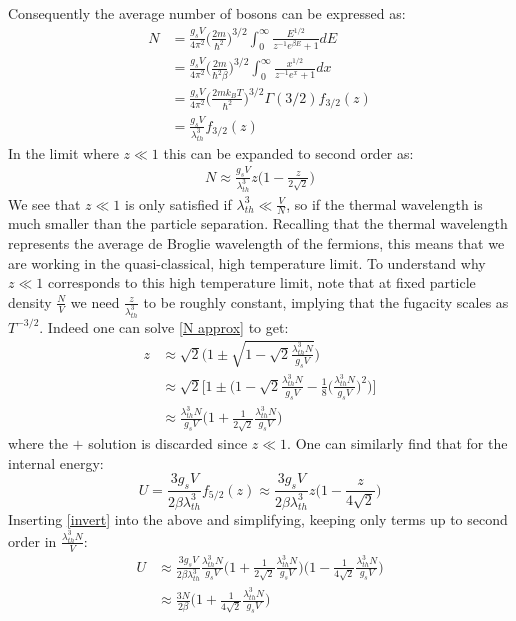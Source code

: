 \documentclass[a4paper,11pt,oneside]{book}
\begin{document}
Consequently the average number of bosons can be expressed as:
\begin{align}
   N &=\frac{g_s V}{4\pi^2} \bigg(\frac{2m}{\hbar^2}\bigg)^{3/2}\int_0^\infty \frac{E^{1/2}}{z^{-1}e^{\beta E}+1} dE\\
    &=\frac{g_s V}{4\pi^2} \bigg(\frac{2m}{\hbar^2 \beta}\bigg)^{3/2}\int_0^\infty \frac{x^{1/2}}{z^{-1}e^{x}+1} dx\\
    &=\frac{g_s V}{4\pi^2} \bigg(\frac{2mk_B T}{\hbar^2}\bigg)^{3/2} \Gamma(3/2) f_{3/2}(z)\\
    &= \frac{g_sV}{\lambda_{th}^3} f_{3/2}(z)
\end{align}
In the limit where $z\ll1$ this can be expanded to second order as:
\begin{align}\label{N approx}
    N\approx \frac{g_s V}{\lambda_{th}^3}z\bigg(1-\frac{z}{2\sqrt{2}}\bigg)
\end{align}
We see that $z\ll1$ is only satisfied if $\lambda_{th}^3\ll\frac{V}{N}$, so if the thermal wavelength is much smaller than the particle separation. Recalling that the thermal wavelength represents the average de Broglie wavelength of the fermions, this means that we are working in the quasi-classical, high temperature limit. To understand why $z\ll 1$ corresponds to this high temperature limit, note that at fixed particle density $\frac{N}{V}$ we need $\frac{z}{\lambda_{th}^3}$ to be roughly constant, implying that the fugacity scales as $T^{-3/2}$. Indeed one can solve \eqref{N approx} to get:
\begin{align}\label{invert}
    z &\approx \sqrt{2}\bigg(1\pm \sqrt{1-\sqrt{2}\frac{\lambda_{th}^3N}{g_sV}}\bigg)\\
    &\approx \sqrt{2}\bigg[1\pm \bigg(1-\sqrt{2}\frac{\lambda_{th}^3N}{g_sV}-\frac{1}{8}\bigg(\frac{\lambda_{th}^3N}{g_sV}\bigg)^2\bigg)\bigg]\\
    &\approx \frac{\lambda_{th}^3 N}{g_sV}\bigg(1+\frac{1}{2\sqrt{2}}\frac{\lambda_{th}^3 N}{g_sV}\bigg)
\end{align}
where the $+$ solution is discarded since $z\ll1$.
One can similarly find that for the internal energy:
\begin{equation}
    U = \frac{3g_sV}{2\beta \lambda_{th}^3} f_{5/2}(z) \approx \frac{3g_sV}{2\beta \lambda_{th}^3}z\bigg(1-\frac{z}{4\sqrt{2}}\bigg)
\end{equation}
Inserting \eqref{invert} into the above and simplifying, keeping only terms up to second order in $\frac{\lambda_{th}^3N}{V}$:
\begin{align}
    U &\approx \frac{3g_sV}{2\beta \lambda_{th}^3}\frac{\lambda_{th}^3 N}{g_sV}\bigg(1+\frac{1}{2\sqrt{2}}\frac{\lambda_{th}^3 N}{g_sV}\bigg)\bigg(1-\frac{1}{4\sqrt{2}}\frac{\lambda_{th}^3 N}{g_sV}\bigg)\\
    &\approx \frac{3N}{2\beta}\bigg(1+\frac{1}{4\sqrt{2}}\frac{\lambda_{th}^3 N}{g_sV}\bigg)
\end{align}
\end{document}
